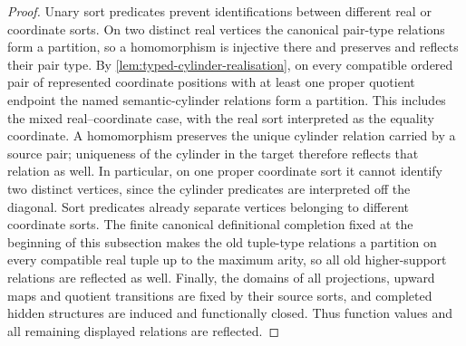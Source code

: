 \begin{proof}
Unary sort predicates prevent identifications between different real or
coordinate sorts.  On two distinct real vertices the canonical pair-type
relations form a partition, so a homomorphism is injective there and preserves
and reflects their pair type.  By
\cref{lem:typed-cylinder-realisation}, on every compatible ordered pair of
represented coordinate positions with at least one proper quotient endpoint
the named semantic-cylinder relations form a partition.  This includes the
mixed real--coordinate case, with the real sort interpreted as the equality
coordinate.  A homomorphism preserves the unique cylinder relation carried by
a source pair; uniqueness of the cylinder in the target therefore reflects
that relation as well.  In particular, on one proper coordinate sort it
cannot identify two distinct vertices, since the cylinder predicates are
interpreted off the diagonal.  Sort predicates already separate vertices
belonging to different coordinate sorts.  The
finite canonical definitional completion fixed at the beginning of this
subsection makes the old tuple-type relations a partition on every compatible
real tuple up to the maximum arity, so all old higher-support relations are
reflected as well.  Finally, the domains of all projections, upward maps and
quotient transitions are fixed by their source sorts, and completed hidden
structures are induced and functionally closed.  Thus function values and all
remaining displayed relations are reflected.
\end{proof}

